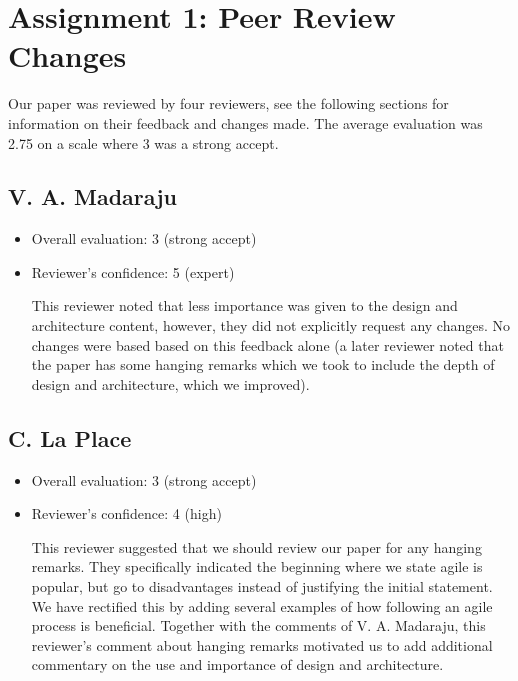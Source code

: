 \documentclass{article}
\begin{document}



\section{Assignment 1: Peer Review Changes}
Our paper was reviewed by four reviewers, see the following sections for information on their feedback and changes made. The average evaluation was 2.75 on a scale where 3 was a strong accept.

\subsection{V. A. Madaraju}
\begin{itemize}
    \item Overall evaluation: 3 (strong accept)
    \item Reviewer's confidence: 5 (expert)

This reviewer noted that less importance was given to the design and architecture content, however, they did not explicitly request any changes.
No changes were based based on this feedback alone (a later reviewer noted that the paper has some hanging remarks which we took to include the depth of design and architecture, which we improved).

\end{itemize}

\subsection{C. La Place}
\begin{itemize}
    \item Overall evaluation: 3 (strong accept)
    \item Reviewer's confidence: 4 (high)

This reviewer suggested that we should review our paper for any hanging remarks. They specifically indicated the beginning where we state agile is popular, but go to disadvantages instead of justifying the initial statement. We have rectified this by adding several examples of how following an agile process is beneficial. Together with the comments of V. A. Madaraju, this reviewer's comment about hanging remarks motivated us to add additional commentary on the use and importance of design and architecture.

\end{itemize}
\end{document}
